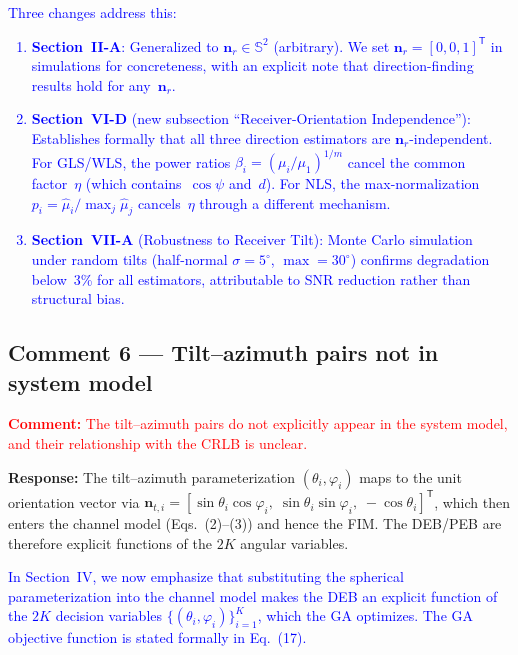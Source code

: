 \documentclass[11pt]{article}
\newcommand{\reviewercomment}[1]{\noindent\textcolor{red}{\textbf{Comment:} #1}\par\vspace{6pt}}
\newcommand{\response}{\noindent\textbf{Response:} }
\newcommand{\change}[1]{\textcolor{blue}{#1}}
\begin{document}
\change{Three changes address this:
\begin{enumerate}
    \item \textbf{Section~II-A}: Generalized to $\mathbf{n}_r \in \mathbb{S}^2$ (arbitrary). We set $\mathbf{n}_r = [0,0,1]^{\mathsf T}$ in simulations for concreteness, with an explicit note that direction-finding results hold for any~$\mathbf{n}_r$.
    \item \textbf{Section~VI-D} (new subsection ``Receiver-Orientation Independence''): Establishes formally that all three direction estimators are $\mathbf{n}_r$-independent. For GLS/WLS, the power ratios $\beta_i = (\mu_i/\mu_1)^{1/m}$ cancel the common factor~$\eta$ (which contains~$\cos\psi$ and~$d$). For NLS, the max-normalization $p_i = \hat\mu_i/\max_j\hat\mu_j$ cancels~$\eta$ through a different mechanism.
    \item \textbf{Section~VII-A} (Robustness to Receiver Tilt): Monte Carlo simulation under random tilts (half-normal $\sigma=5^\circ$, $\max=30^\circ$) confirms degradation below~3\% for all estimators, attributable to SNR reduction rather than structural bias.
\end{enumerate}}

\subsection{Comment 6 --- Tilt--azimuth pairs not in system model}

\reviewercomment{The tilt--azimuth pairs do not explicitly appear in the system model, and their relationship with the CRLB is unclear.}

\response The tilt--azimuth parameterization $(\theta_i, \varphi_i)$ maps to the unit orientation vector via $\mathbf{n}_{t,i} = [\sin\theta_i\cos\varphi_i,\;\sin\theta_i\sin\varphi_i,\;-\cos\theta_i]^{\mathsf T}$, which then enters the channel model (Eqs.~(2)--(3)) and hence the FIM. The DEB/PEB are therefore explicit functions of the $2K$ angular variables.

\change{In Section~IV, we now emphasize that substituting the spherical parameterization into the channel model makes the DEB an explicit function of the $2K$ decision variables $\{(\theta_i,\varphi_i)\}_{i=1}^K$, which the GA optimizes. The GA objective function is stated formally in Eq.~(17).}

\end{document}
